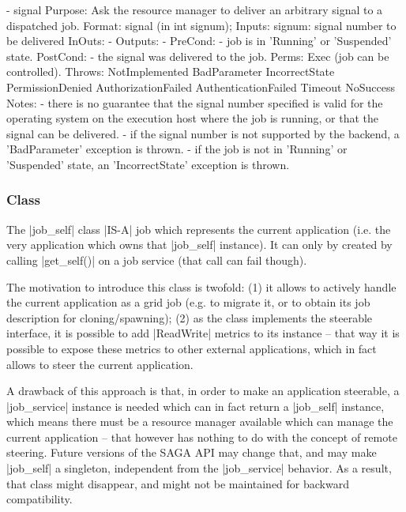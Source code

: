 \begin{myspec}
 
    - signal
      Purpose:  Ask the resource manager to deliver an arbitrary
                signal to a dispatched job.
      Format:   signal               (in int signum);	
      Inputs:   signum:               signal number to be
                                      delivered
      InOuts:   -
      Outputs:  -
      PreCond:  - job is in 'Running' or 'Suspended' state.
      PostCond: - the signal was delivered to the job.
      Perms:    Exec (job can be controlled).
      Throws:   NotImplemented
                BadParameter
                IncorrectState
                PermissionDenied
                AuthorizationFailed
                AuthenticationFailed
                Timeout
                NoSuccess
      Notes:    - there is no guarantee that the signal number 
                  specified is valid for the operating system 
                  on the execution host where the job is 
                  running, or that the signal can be delivered.
                - if the signal number is not supported by the
                  backend, a 'BadParameter' exception is thrown.
                - if the job is not in 'Running' or 'Suspended'
                  state, an 'IncorrectState' exception is 
                  thrown.
 \end{myspec}
 
 
 \subsubsection*{Class }
 
    The |job_self| class |IS-A| job which represents the current
    application (i.e. the very application which owns that
    |job_self| instance).  It can only by created by calling
    |get_self()| on a job service (that call can fail though).
 
    The motivation to introduce this class is twofold: (1) it
    allows to actively handle the current application as a grid
    job (e.g. to migrate it, or to obtain its job description
    for cloning/spawning); (2) as the class implements the
    steerable interface, it is possible to add |ReadWrite|
    metrics to its instance -- that way it is possible to expose
    these metrics to other external applications, which in fact
    allows to steer the current application.
 
    A drawback of this approach is that, in order to make an
    application steerable, a |job_service| instance is needed
    which can in fact return a |job_self| instance, which means
    there must be a resource manager available which can manage
    the current application -- that however has nothing to do
    with the concept of remote steering.  Future versions of the
    SAGA API may change that, and may make |job_self| a
    singleton, independent from the |job_service| behavior.  As
    a result, that class might disappear, and might not be
    maintained for backward compatibility.
 
